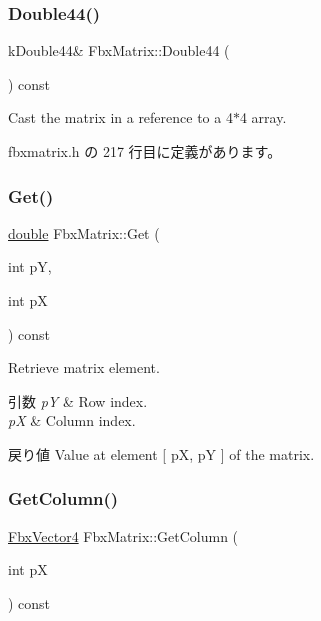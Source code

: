 \mbox{\label{class_fbx_matrix_a0bb3a6188a337f2ae4e92bef4d2a0a3a}} 
\subsubsection{\texorpdfstring{Double44()}{Double44()}}
{\footnotesize\ttfamily k\+Double44\& Fbx\+Matrix\+::\+Double44 (\begin{DoxyParamCaption}{ }\end{DoxyParamCaption}) const\hspace{0.3cm}{\ttfamily [inline]}}



Cast the matrix in a reference to a 4$\ast$4 array. 



 fbxmatrix.\+h の 217 行目に定義があります。

\mbox{\label{class_fbx_matrix_a4efcbbd102b39375a1415b496c302ada}} 
\subsubsection{\texorpdfstring{Get()}{Get()}}
{\footnotesize\ttfamily \hyperlink{class_fbx_matrix_a01f8be57393e5d9973b23897c29d5520}{double} Fbx\+Matrix\+::\+Get (\begin{DoxyParamCaption}\item[{int}]{pY,  }\item[{int}]{pX }\end{DoxyParamCaption}) const}

Retrieve matrix element. 
\begin{DoxyParams}{引数}
{\em pY} & Row index. \\
\hline
{\em pX} & Column index. \\
\hline
\end{DoxyParams}
\begin{DoxyReturn}{戻り値}
Value at element \mbox{[} pX, pY \mbox{]} of the matrix. 
\end{DoxyReturn}
\mbox{\label{class_fbx_matrix_a1954028d6d499f4e5abb3395dd44b973}} 
\subsubsection{\texorpdfstring{Get\+Column()}{GetColumn()}}
{\footnotesize\ttfamily \hyperlink{class_fbx_vector4}{Fbx\+Vector4} Fbx\+Matrix\+::\+Get\+Column (\begin{DoxyParamCaption}\item[{int}]{pX }\end{DoxyParamCaption}) const}

